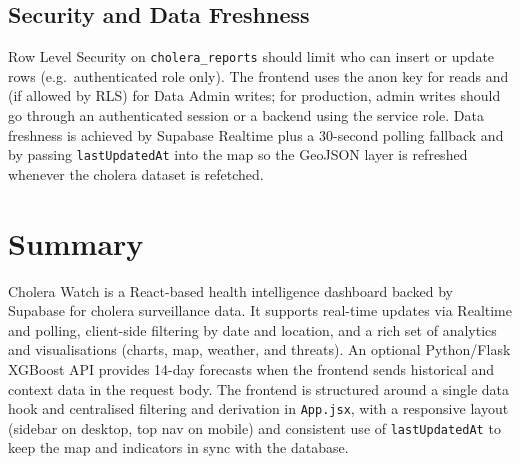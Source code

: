 \documentclass[11pt,a4paper]{article}
\begin{document}
\subsection{Security and Data Freshness}

Row Level Security on \texttt{cholera\_reports} should limit who can insert or update rows (e.g.\ authenticated role only). The frontend uses the anon key for reads and (if allowed by RLS) for Data Admin writes; for production, admin writes should go through an authenticated session or a backend using the service role. Data freshness is achieved by Supabase Realtime plus a 30-second polling fallback and by passing \texttt{lastUpdatedAt} into the map so the GeoJSON layer is refreshed whenever the cholera dataset is refetched.

\section{Summary}

Cholera Watch is a React-based health intelligence dashboard backed by Supabase for cholera surveillance data. It supports real-time updates via Realtime and polling, client-side filtering by date and location, and a rich set of analytics and visualisations (charts, map, weather, and threats). An optional Python/Flask XGBoost API provides 14-day forecasts when the frontend sends historical and context data in the request body. The frontend is structured around a single data hook and centralised filtering and derivation in \texttt{App.jsx}, with a responsive layout (sidebar on desktop, top nav on mobile) and consistent use of \texttt{lastUpdatedAt} to keep the map and indicators in sync with the database.
\end{document}

